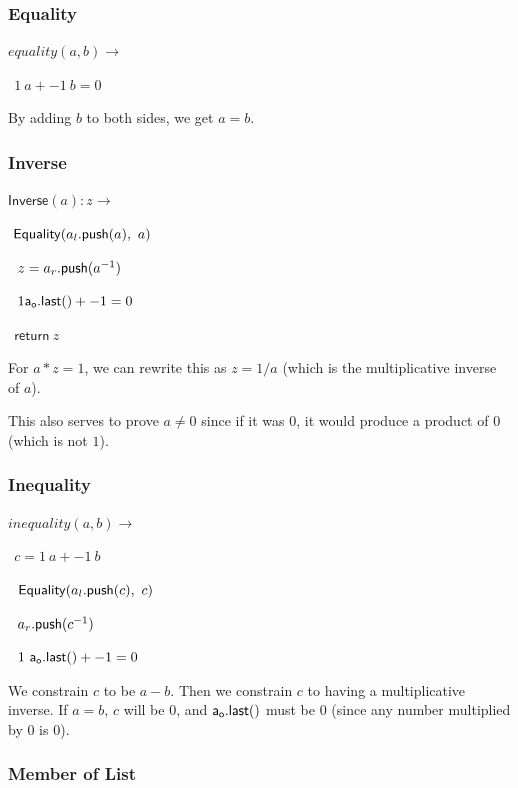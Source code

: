 \documentclass[]{article}
\begin{document}
\newcommand{\all}{\mathsf{a_l.last()}}
\newcommand{\arl}{\mathsf{a_r.last()}}

\subsubsection{Equality}

\newcommand{\equality}{\mathsf{Equality}}

$equality(a, b) \rightarrow$

$~~1 ~a + -1 ~b = 0$

By adding $b$ to both sides, we get $a = b$.

\subsubsection{Inverse}

\newcommand{\inverse}{\mathsf{Inverse}}

$\inverse(a): z \rightarrow$

$~\equality(\al(a), ~a)$

$~~z = a_r\mathsf{.push}(a^{-1})$

$~~1 \mathsf{a_o.last()} + -1 = 0$

$~~\mathsf{return} ~z$

For $a * z = 1$, we can rewrite this as $z = 1/a$ (which is the multiplicative inverse of $a$).

This also serves to prove $a \ne 0$ since if it was $0$, it would produce a product of $0$ (which is not $1$).

\subsubsection{Inequality}

\newcommand{\inequality}{\mathsf{Inequality}}

$inequality(a, b) \rightarrow$

$~~c = 1 ~a + -1 ~b$

$~~\equality(\al(c), ~c)$

$~~a_r\mathsf{.push}(c^{-1})$

$~~1 ~\mathsf{a_o.last()} + -1 = 0$

We constrain $c$ to be $a - b$. Then we constrain $c$ to having a multiplicative inverse. If $a = b$, $c$ will be $0$, and $\mathsf{a_o.last()}$ must be $0$ (since any number multiplied by $0$ is $0$).

\subsubsection{Member of List}
\end{document}
